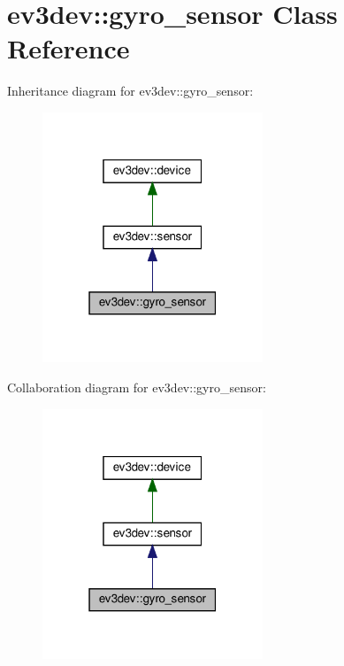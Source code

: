 \hypertarget{classev3dev_1_1gyro__sensor}{}\section{ev3dev\+:\+:gyro\+\_\+sensor Class Reference}
\label{classev3dev_1_1gyro__sensor}


Inheritance diagram for ev3dev\+:\+:gyro\+\_\+sensor\+:
\nopagebreak
\begin{figure}[H]
\begin{center}
\leavevmode
\includegraphics[width=187pt]{classev3dev_1_1gyro__sensor__inherit__graph}
\end{center}
\end{figure}


Collaboration diagram for ev3dev\+:\+:gyro\+\_\+sensor\+:
\nopagebreak
\begin{figure}[H]
\begin{center}
\leavevmode
\includegraphics[width=187pt]{classev3dev_1_1gyro__sensor__coll__graph}
\end{center}
\end{figure}
